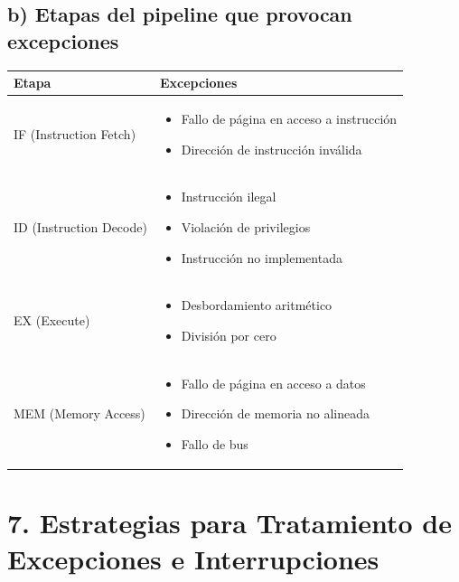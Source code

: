 \documentclass[12pt]{article}
\begin{document}
\subsection*{b) Etapas del pipeline que provocan excepciones}
\begin{table}[h]
\centering
\begin{tabular}{|l|p{10cm}|}
\hline
\textbf{Etapa} & \textbf{Excepciones} \\
\hline
IF (Instruction Fetch) & 
\begin{itemize}
    \item Fallo de página en acceso a instrucción
    \item Dirección de instrucción inválida
\end{itemize} \\
\hline
ID (Instruction Decode) & 
\begin{itemize}
    \item Instrucción ilegal
    \item Violación de privilegios
    \item Instrucción no implementada
\end{itemize} \\
\hline
EX (Execute) & 
\begin{itemize}
    \item Desbordamiento aritmético
    \item División por cero
\end{itemize} \\
\hline
MEM (Memory Access) & 
\begin{itemize}
    \item Fallo de página en acceso a datos
    \item Dirección de memoria no alineada
    \item Fallo de bus
\end{itemize} \\
\hline
\end{tabular}
\end{table}

\section*{7. Estrategias para Tratamiento de Excepciones e Interrupciones}
\end{document}
